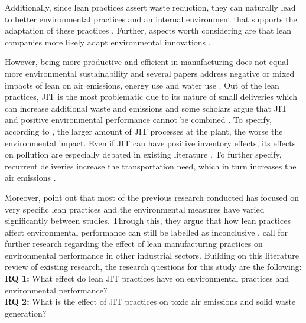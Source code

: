 Additionally, since lean practices assert waste reduction, they can naturally lead to better environmental practices and an internal environment that supports the adaptation of these practices \citep{garza-reyesEffectLeanMethods2018}. 
Further, aspects worth considering are that lean companies more likely adapt environmental innovations \citep{mollenkopfGreenLeanGlobal2010, garza-reyesEffectLeanMethods2018}. 

However, being more productive and efficient in manufacturing does not equal more environmental sustainability and several papers address negative or mixed impacts of lean on air emissions, energy use and water use \citep{diesteEvaluatingImpactLean2020}. 
Out of the lean practices, JIT is the most problematic due to its nature of small deliveries which can increase additional waste and emissions \citep{rothenbergLEANGREENQUEST2009, Venkat_Wakeland_2006, diesteEvaluatingImpactLean2020} and some scholars argue that JIT and positive environmental performance cannot be combined \citep{zhuRelationshipsOperationalPractices2004, diesteEvaluatingImpactLean2020}. 
To specify, according to \citep{sartalAreAllLean2018, diesteEvaluatingImpactLean2020}, the larger amount of JIT processes at the plant, the worse the environmental impact. 
Even if JIT can have positive inventory effects, its effects on pollution are especially debated in existing literature \citep{garza-reyesEffectLeanMethods2018}. 
To further specify, recurrent deliveries increase the transportation need, which in turn increases the air emissions \citep{diesteEvaluatingImpactLean2020}.

Moreover, \citep{garza-reyesEffectLeanMethods2018} point out that most of the previous research conducted has focused on very specific lean practices and the environmental measures have varied significantly between studies. 
Through this, they argue that how lean practices affect environmental performance can still be labelled as inconclusive \citep{garza-reyesEffectLeanMethods2018}. 
\citep{garza-reyesEffectLeanMethods2018} call for further research regarding the effect of lean manufacturing practices on environmental performance in other industrial sectors.
Building on this literature review of existing research, the research questions for this study are the following:\\

\textbf{RQ 1:} What effect do lean JIT practices have on environmental practices and environmental performance?\\

\textbf{RQ 2:} What is the effect of JIT practices on toxic air emissions and solid waste generation?
